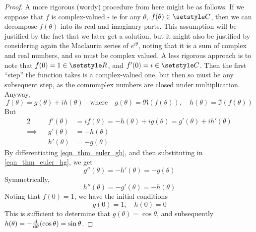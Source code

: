 \begin{proof}
 A more rigorous (wordy) procedure from here might be as follows. If we suppose
 that \(f\) is complex-valued - ie for any \(\theta\),
 \(f(\theta) \in \Complex\), then we can decompose \(f(\theta)\) into its real
 and imaginary parts. This assumption will be justified by the fact that we
 later get a solution, but it might also be justified by considering again the
 Maclaurin series of \(e^{i\theta}\), noting that it is a sum of complex and
 real numbers, and so must be complex valued. A less rigorous approach is to
 note that \(f(0) = 1 \in \Reals\), and \(f'(0) = i \in \Complex\). Then the
 first ``step'' the function takes is a complex-valued one, but then so must be
 any subsequent step, as the commmplex numbers are closed under multiplication.
  Anyway,
 \begin{equation*}
  f(\theta) = g(\theta) + i h(\theta)
   \quad \text{where} \quad
    g(\theta) = \Re(f(\theta)),\quad h(\theta) = \Im(f(\theta))
 \end{equation*}
 But
 \begin{alignat*}2
  && f'(\theta) &= if(\theta) = -h(\theta) + ig(\theta)
                 = g'(\theta) + ih'(\theta) \\
  \implies{}&&
      g'(\theta) &= -h(\theta) \tag{\(\ast\)} \label{eqn_thm_euler_gh} \\
  &&  h'(\theta) &= -g(\theta) \tag{\(\ast\ast\)} \label{eqn_thm_euler_hg}
 \end{alignat*}
    By differentiating \ref{eqn_thm_euler_gh}, and then substituting in
    \ref{eqn_thm_euler_hg}, we get
    \begin{equation*}
     g''(\theta) = -h'(\theta) = -g(\theta)
    \end{equation*}
    Symmetrically,
    \begin{equation*}
     h''(\theta) = -g'(\theta) = -h(\theta)
    \end{equation*}
    Noting that \(f(0) = 1\), we have the initial conditions
    \begin{equation*}
     g(0) = 1, \quad h(0) = 0
    \end{equation*}
    This is sufficient to determine that \(g(\theta) = \cos \theta\), and
    subsequently \(h(\theta) = -\dv{\theta}(\cos \theta) = \sin \theta\).
\end{proof}
